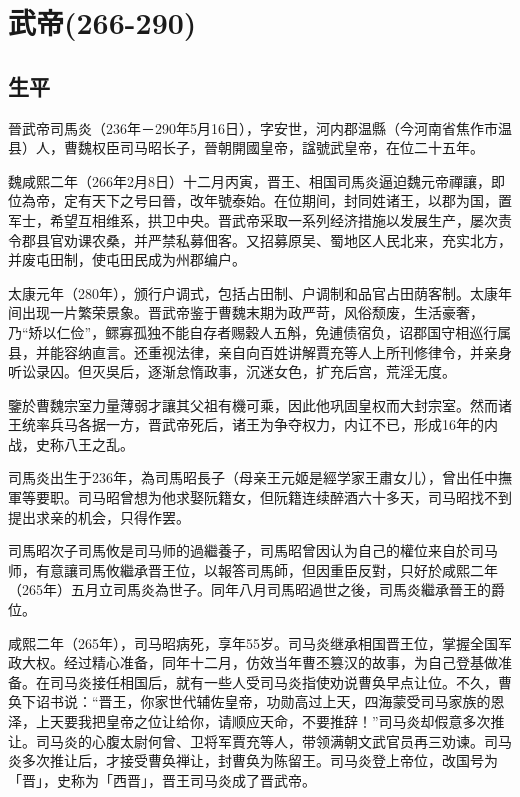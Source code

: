 
\section{武帝\tiny(266-290)}

\subsection{生平}

晉武帝司馬炎（236年－290年5月16日），字安世，河内郡温縣（今河南省焦作市温县）人，曹魏权臣司马昭长子，晉朝開國皇帝，諡號武皇帝，在位二十五年。

魏咸熙二年（266年2月8日）十二月丙寅，晋王、相国司馬炎逼迫魏元帝禪讓，即位為帝，定有天下之号曰晉，改年號泰始。在位期间，封同姓诸王，以郡为国，置军士，希望互相维系，拱卫中央。晋武帝采取一系列经济措施以发展生产，屡次责令郡县官劝课农桑，并严禁私募佃客。又招募原吴、蜀地区人民北来，充实北方，并废屯田制，使屯田民成为州郡编户。

太康元年（280年），颁行户调式，包括占田制、户调制和品官占田荫客制。太康年间出现一片繁荣景象。晋武帝鉴于曹魏末期为政严苛，风俗颓废，生活豪奢，乃“矫以仁俭”，鳏寡孤独不能自存者赐穀人五斛，免逋债宿负，诏郡国守相巡行属县，并能容纳直言。还重视法律，亲自向百姓讲解賈充等人上所刊修律令，并亲身听讼录囚。但灭吳后，逐渐怠惰政事，沉迷女色，扩充后宫，荒淫无度。

鑒於曹魏宗室力量薄弱才讓其父祖有機可乘，因此他巩固皇权而大封宗室。然而诸王统率兵马各据一方，晋武帝死后，诸王为争夺权力，内讧不已，形成16年的内战，史称八王之乱。

司馬炎出生于236年，為司馬昭長子（母亲王元姬是經学家王肅女儿），曾出任中撫軍等要职。司马昭曾想为他求娶阮籍女，但阮籍连续醉酒六十多天，司马昭找不到提出求亲的机会，只得作罢。

司馬昭次子司馬攸是司马师的過繼養子，司馬昭曾因认为自己的權位来自於司马师，有意讓司馬攸繼承晋王位，以報答司馬師，但因重臣反對，只好於咸熙二年（265年）五月立司馬炎為世子。同年八月司馬昭過世之後，司馬炎繼承晉王的爵位。

咸熙二年（265年），司马昭病死，享年55岁。司马炎继承相国晋王位，掌握全国军政大权。经过精心准备，同年十二月，仿效当年曹丕篡汉的故事，为自己登基做准备。在司马炎接任相国后，就有一些人受司马炎指使劝说曹奂早点让位。不久，曹奂下诏书说：“晋王，你家世代辅佐皇帝，功勋高过上天，四海蒙受司马家族的恩泽，上天要我把皇帝之位让给你，请顺应天命，不要推辞！”司马炎却假意多次推让。司马炎的心腹太尉何曾、卫将军賈充等人，带领满朝文武官员再三劝谏。司马炎多次推让后，才接受曹奂禅让，封曹奂为陈留王。司马炎登上帝位，改国号为「晋」，史称为「西晋」，晋王司马炎成了晋武帝。


